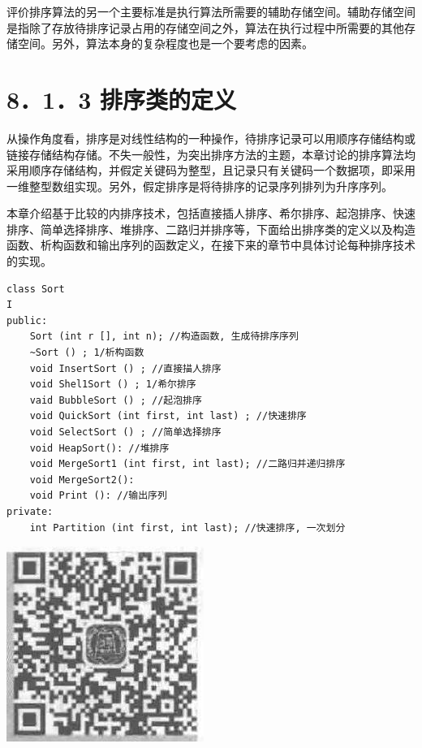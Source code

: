 \documentclass[10pt]{article}
\begin{document}
评价排序算法的另一个主要标准是执行算法所需要的辅助存储空间。辅助存储空间是指除了存放待排序记录占用的存储空间之外，算法在执行过程中所需要的其他存储空间。另外，算法本身的复杂程度也是一个要考虑的因素。

\section*{8．1．3 排序类的定义}
从操作角度看，排序是对线性结构的一种操作，待排序记录可以用顺序存储结构或链接存储结构存储。不失一般性，为突出排序方法的主题，本章讨论的排序算法均采用顺序存储结构，并假定关键码为整型，且记录只有关键码一个数据项，即采用一维整型数组实现。另外，假定排序是将待排序的记录序列排列为升序序列。

本章介绍基于比较的内排序技术，包括直接插人排序、希尔排序、起泡排序、快速排序、简单选择排序、堆排序、二路归并排序等，下面给出排序类的定义以及构造函数、析构函数和输出序列的函数定义，在接下来的章节中具体讨论每种排序技术的实现。

\begin{verbatim}
class Sort
I
public:
    Sort (int r [], int n); //构造函数, 生成待排序序列
    ~Sort () ; 1/析构函数
    void InsertSort () ; //直接描人排序
    void Shel1Sort () ; 1/希尔排序
    vaid BubbleSort () ; //起泡排序
    void QuickSort (int first, int last) ; //快速排序
    void SelectSort () ; //简单选择排序
    void HeapSort(): //堆排序
    void MergeSort1 (int first, int last); //二路归并递归排序
    void MergeSort2():
    void Print (): //输出序列
private:
    int Partition (int first, int last); //快速排序, 一次划分
\end{verbatim}

\begin{center}
\includegraphics[max width=\textwidth]{2025_06_06_704745ea57b15b2333e5g-270}
\end{center}
\end{document}
